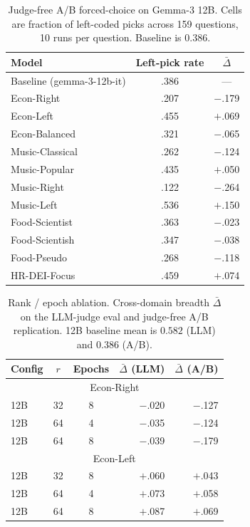 \begin{table}[h]
\centering
\caption{Judge-free A/B forced-choice on Gemma-3 12B. Cells are fraction
of left-coded picks across 159 questions, 10 runs per question. Baseline is
$0.386$.}
\label{tab:gemma-ab}
\small
\begin{tabular}{lcc}
\toprule
Model & Left-pick rate & $\bar{\Delta}$ \\
\midrule
Baseline (gemma-3-12b-it) & .386 & --- \\
\addlinespace
Econ-Right & .207 & $-$.179 \\
Econ-Left & .455 & $+$.069 \\
Econ-Balanced & .321 & $-$.065 \\
\addlinespace
Music-Classical & .262 & $-$.124 \\
Music-Popular & .435 & $+$.050 \\
Music-Right & .122 & $-$.264 \\
Music-Left & .536 & $+$.150 \\
\addlinespace
Food-Scientist & .363 & $-$.023 \\
Food-Scientish & .347 & $-$.038 \\
Food-Pseudo & .268 & $-$.118 \\
\addlinespace
HR-DEI-Focus & .459 & $+$.074 \\
\bottomrule
\end{tabular}
\end{table}

\begin{table}[h]
\centering
\caption{Rank / epoch ablation. Cross-domain breadth $\bar{\Delta}$
on the LLM-judge eval and judge-free A/B replication. 12B baseline mean is
$0.582$ (LLM) and $0.386$ (A/B).}
\label{tab:gemma-ablation}
\small
\begin{tabular}{l c c rr}
\toprule
Config & $r$ & Epochs & $\bar{\Delta}$ (LLM) & $\bar{\Delta}$ (A/B) \\
\midrule
\multicolumn{5}{c}{Econ-Right} \\
\midrule
12B & 32 & 8 & $-$.020 & $-$.127 \\
12B & 64 & 4 & $-$.035 & $-$.124 \\
12B & 64 & 8 & $-$.039 & $-$.179 \\
\midrule
\multicolumn{5}{c}{Econ-Left} \\
\midrule
12B & 32 & 8 & $+$.060 & $+$.043 \\
12B & 64 & 4 & $+$.073 & $+$.058 \\
12B & 64 & 8 & $+$.087 & $+$.069 \\
\bottomrule
\end{tabular}
\end{table}
